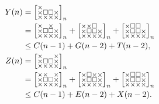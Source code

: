 \documentclass[a4paper,12pt]{article}
\makeatletter
\newenvironment{grid}
  {\begingroup\footnotesize
   \renewcommand{\arraystretch}{0}
   \setlength{\arraycolsep}{0pt}
   \left[\begin{array}{@{}*{10}{c}@{}}}
  {\end{array}\right]\endgroup}
\newcommand{\void}{\phantom{\times}}
\newcommand{\myY}{
    \begin{grid}
        \times & \void & \void & \void \\
        \times & \square & \square & \times \\
        \times & \times & \times & \times
    \end{grid}
}
\newcommand{\myZ}{
    \begin{grid}
        \times & \void & \void & \times \\
        \times & \square & \square & \times \\
        \times & \times & \times & \times
    \end{grid}
}
\makeatother
\begin{document}
	\begin{align*}
	Y(n) &= \myY_n \\
    &= \begin{grid}
        \times & \void & \times & \void \\
        \times & \square & \square & \times \\
        \times & \times & \times & \times
    \end{grid}_n + \begin{grid}
        \times & \times & \square & \void \\
        \times & \square & \square & \times \\
        \times & \times & \times & \times
    \end{grid}_n + \begin{grid}
        \times & \square & \square & \void \\
        \times & \square & \square & \times \\
        \times & \times & \times & \times
    \end{grid}_n \\
    &\le C(n-1) + G(n-2) + T(n-2), \\
	Z(n) &= \myZ_n \\
    &= \begin{grid}
        \times & \times & \void & \times \\
        \times & \square & \square & \times \\
        \times & \times & \times & \times
    \end{grid}_n + \begin{grid}
        \times & \square & \times & \times \\
        \times & \square & \square & \times \\
        \times & \times & \times & \times
    \end{grid}_n + \begin{grid}
        \times & \square & \square & \times \\
        \times & \square & \square & \times \\
        \times & \times & \times & \times
    \end{grid}_n \\
    &\le C(n-1) + E(n-2) + X(n-2).
	\end{align*}
\end{document}
